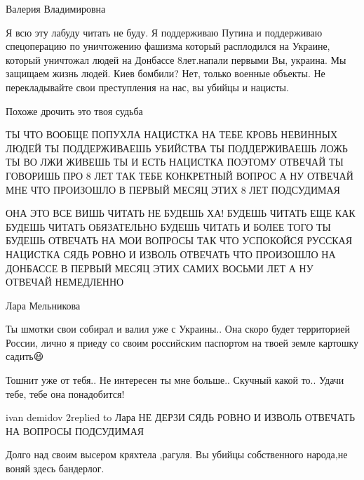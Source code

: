  
 
 
 
 

Валерия Владимировна

Я всю эту лабуду читать не буду. Я поддерживаю Путина и поддерживаю
спецоперацию по уничтожению фашизма который расплодился на Украине, который
уничтожал людей на Донбассе 8лет.напали первыми Вы, украина. Мы защищаем жизнь
людей. Киев бомбили? Нет, только военные объекты. Не перекладывайте свои
преступления на нас, вы убийцы и нацисты.

Похоже дрочить это твоя судьба

ТЫ ЧТО ВООБЩЕ ПОПУХЛА НАЦИСТКА НА ТЕБЕ КРОВЬ НЕВИННЫХ ЛЮДЕЙ ТЫ ПОДДЕРЖИВАЕШЬ
УБИЙСТВА ТЫ ПОДДЕРЖИВАЕШЬ ЛОЖЬ ТЫ ВО ЛЖИ ЖИВЕШЬ ТЫ И ЕСТЬ НАЦИСТКА ПОЭТОМУ
ОТВЕЧАЙ ТЫ ГОВОРИШЬ ПРО 8 ЛЕТ ТАК ТЕБЕ КОНКРЕТНЫЙ ВОПРОС А НУ ОТВЕЧАЙ МНЕ ЧТО
ПРОИЗОШЛО В ПЕРВЫЙ МЕСЯЦ ЭТИХ 8 ЛЕТ ПОДСУДИМАЯ

ОНА ЭТО ВСЕ ВИШЬ ЧИТАТЬ НЕ БУДЕШЬ ХА! БУДЕШЬ ЧИТАТЬ ЕЩЕ КАК БУДЕШЬ ЧИТАТЬ
ОБЯЗАТЕЛЬНО БУДЕШЬ ЧИТАТЬ И БОЛЕЕ ТОГО ТЫ БУДЕШЬ ОТВЕЧАТЬ НА МОИ ВОПРОСЫ ТАК
ЧТО УСПОКОЙСЯ РУССКАЯ НАЦИСТКА СЯДЬ РОВНО И ИЗВОЛЬ ОТВЕЧАТЬ ЧТО ПРОИЗОШЛО НА
ДОНБАССЕ В ПЕРВЫЙ МЕСЯЦ ЭТИХ САМИХ ВОСЬМИ ЛЕТ А НУ ОТВЕЧАЙ НЕМЕДЛЕННО

Лара Мельникова

Ты шмотки свои собирал и валил уже с Украины.. Она скоро будет территорией России, лично я приеду со своим российским паспортом на твоей земле картошку садить😃

Тошнит уже от тебя.. Не интересен ты мне больше.. Скучный какой то.. Удачи тебе, тебе она понадобится!

ivan demidov 2replied to Лара
НЕ ДЕРЗИ СЯДЬ РОВНО И ИЗВОЛЬ ОТВЕЧАТЬ НА ВОПРОСЫ ПОДСУДИМАЯ


Долго над своим высером кряхтела ,рагуля. Вы убийцы собственного народа,не воняй здесь бандерлог.
